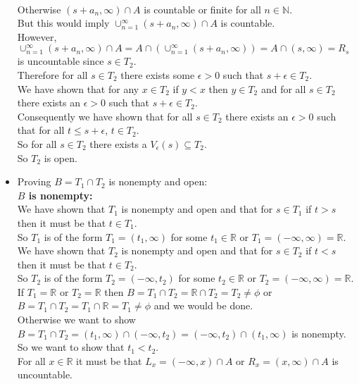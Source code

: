 \documentclass{article}
\begin{document}
\begin{center}
\begin{itemize}
        \\Otherwise $(s + a_n, \infty)\cap A$ is countable or finite for all $n\in\mathbb{N}$.
        \\But this would imply $\cup _{n=1}^{\infty} (s + a_n, \infty)\cap A$ is countable.
        \\However, $\cup _{n=1}^{\infty} (s + a_n, \infty)\cap A = A\cap (\cup _{n=1}^{\infty} (s + a_n, \infty)) = A\cap (s, \infty) = R_s$ is uncountable since $s\in T_2$.
        \\Therefore for all $s\in T_2$ there exists some $\epsilon > 0$ such that $s +\epsilon\in T_2$.
        \\We have shown that for any $x\in T_2$ if $y < x$ then $y\in T_2$ and for all $s\in T_2$ there exists an $\epsilon > 0$ such that $s +\epsilon\in T_2$.
        \\Consequently we have shown that for all $s\in T_2$ there exists an $\epsilon > 0$ such that for all $t\leq s +\epsilon$, $t\in T_2$.
        \\So for all $s\in T_2$ there exists a $V_{\epsilon} (s)\subseteq T_2$.
        \\So $T_2$ is open.
        \item Proving $B = T_1\cap T_2$ is nonempty and open:
        \\\textbf{$B$ is nonempty:}
        \\We have shown that $T_1$ is nonempty and open and that for $s\in T_1$ if $t > s$ then it must be that $t\in T_1$.
        \\So $T_1$ is of the form $T_1 = (t_1, \infty)$ for some $t_1\in\mathbb{R}$ or $T_1 = (-\infty, \infty) =\mathbb{R}$.
        \\We have shown that $T_2$ is nonempty and open and that for $s\in T_2$ if $t < s$ then it must be that $t\in T_2$.
        \\So $T_2$ is of the form $T_2 = (-\infty, t_2)$ for some $t_2\in\mathbb{R}$ or $T_2 = (-\infty, \infty) =\mathbb{R}$.
        \\If $T_1 =\mathbb{R}$ or $T_2 =\mathbb{R}$ then $B = T_1\cap T_2 =\mathbb{R}\cap T_2 = T_2\neq\phi$ or $B = T_1\cap T_2 = T_1\cap\mathbb{R} = T_1\neq\phi$ and we would be done.
        \\Otherwise we want to show $B = T_1\cap T_2 = (t_1, \infty)\cap (-\infty, t_2) = (-\infty, t_2)\cap (t_1, \infty)$ is nonempty.
        \\So we want to show that $t_1 < t_2$.
        \\For all $x\in\mathbb{R}$ it must be that $L_x = (-\infty, x)\cap A$ or $R_x = (x, \infty)\cap A$ is uncountable.

\end{itemize}
\end{center}
\end{document}

